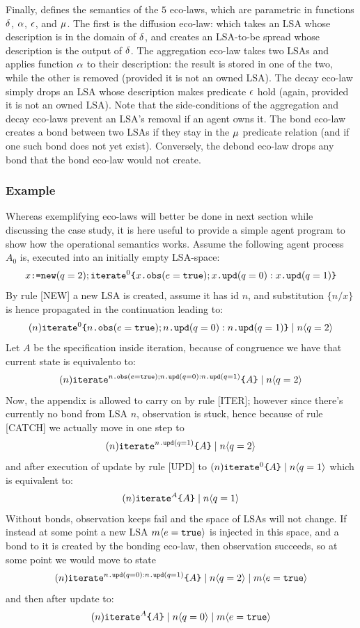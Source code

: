 \documentclass[12pt,a4paper,twoside,openright]{book}
\begin{document}
Finally,  defines the semantics of the $5$ eco-laws, which are parametric in functions $\fDiff$, $\fAggr$, $\fDecay$, and $\fBond$.
%
The first is the diffusion eco-law: which takes an LSA whose description is in the domain of $\fDiff$, and creates an LSA-to-be spread whose description is the output of $\fDiff$.
%
The aggregation eco-law takes two LSAs and applies function $\fAggr$ to their description: the result is stored in one of the two, while the other is removed (provided it is not an owned LSA).
%
The decay eco-law simply drops an LSA whose description makes predicate $\fDecay$ hold (again, provided it is not an owned LSA).
%
Note that the side-conditions of the aggregation and decay eco-laws prevent an LSA's removal if an agent owns it.
%
The bond eco-law creates a bond between two LSAs if they stay in the $\fBond$ predicate relation (and if one such bond does not yet exist).
%
Conversely, the debond eco-law drops any bond that the bond eco-law would not create.

\subsubsection{Example}

Whereas exemplifying eco-laws will better be done in next section while discussing the case study, it is here useful to provide a simple agent program to show how the operational semantics works.
%
Assume the following agent process $A_0$ is, executed into an initially empty LSA-space:
%
\[\cNew{x}{q=2};\cRecR{\cObs{x}{e=\texttt{true}};\cUpd{x}{q=0}:\cUpd{x}{q=1}}{0}\]
%
By rule [NEW] a new LSA is created, assume it has id $n$, and substitution $\{n/x\}$ is hence propagated in the continuation leading to:
%
\[(n)\cRecR{\cObs{n}{e=\texttt{true}};\cUpd{n}{q=0}:\cUpd{n}{q=1}}{0}\oCPar\cLSA{n}{q=2}\]
%
Let $A$ be the specification inside iteration, because of congruence we have that current state is equivalento to:
%
\[(n)\cRecR{A}{\cObs{n}{e=\texttt{true}};\cUpd{n}{q=0}:\cUpd{n}{q=1}}\oCPar\cLSA{n}{q=2}\]
%
Now, the appendix is allowed to carry on by rule [ITER]; however since there's currently no bond from LSA $n$, observation is stuck, hence because of rule [CATCH] we actually move in one step to
%
\[(n)\cRecR{A}{\cUpd{n}{q=1}}\oCPar\cLSA{n}{q=2}\]
%
and after execution of update by rule [UPD] to \mbox{$(n)\cRecR{A}{0}\oCPar\cLSA{n}{q=1}$} which is equivalent to:
%
\[(n)\cRecR{A}{A}\oCPar\cLSA{n}{q=1}\]
%
Without bonds, observation keeps fail and the space of LSAs will not change.
%
If instead at some point a new LSA $\cLSA{m}{e=\texttt{true}}$ is injected in this space, and a bond to it is created by the bonding eco-law, then observation succeeds, so at some point we would move to state
%
\[(n)\cRecR{A}{\cUpd{n}{q=0}:\cUpd{n}{q=1}}\oCPar\cLSA{n}{q=2}\oCPar\cLSA{m}{e=\texttt{true}}\]
%
and then after update to:
%
\[(n)\cRecR{A}{A}\oCPar\cLSA{n}{q=0}\oCPar\cLSA{m}{e=\texttt{true}}\]
\end{document}
